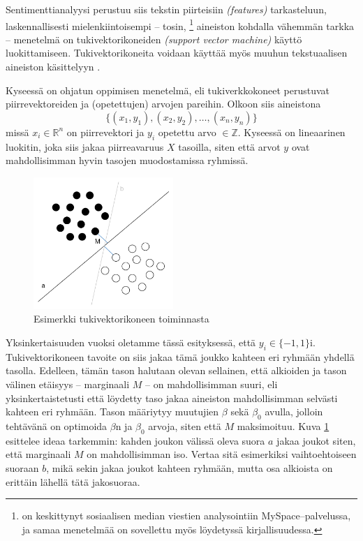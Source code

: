 \documentclass[finnish,gradu,twoside,12pt]{tktltiki}
\begin{document}
{Sentimenttianalyysi perustuu siis tekstin piirteisiin \textit{(features)} tarkasteluun, laskennallisesti mielenkiintoisempi -- tosin, \citet{Thelwall2010}\footnote{\citet{Thelwall2010} on keskittynyt sosiaalisen median viestien analysointiin MySpace--palvelussa, ja samaa menetelmää on sovellettu myös löydetyssä kirjallisuudessa.} aineiston kohdalla vähemmän tarkka -- menetelmä on tukivektorikoneiden \textit{(support vector machine)} käyttö luokittamiseen. Tukivektorikoneita voidaan käyttää myös muuhun tekstuaalisen aineiston käsittelyyn \citep[esimerkiksi][]{Weber2012}.

Kyseessä on ohjatun oppimisen menetelmä, eli tukiverkkokoneet perustuvat piirrevektoreiden ja (opetettujen) arvojen pareihin. Olkoon siis aineistona $$\{ (x_1, y_1), (x_2, y_2), \ldots, (x_n, y_n) \}$$ missä $x_i \in \mathbb{R}^n$ on piirrevektori ja $y_i$ opetettu arvo $\in \mathbb{Z}$. Kyseessä on lineaarinen luokitin, joka siis jakaa piirreavaruus $X$ tasoilla, siten että arvot $y$ ovat mahdollisimman hyvin tasojen muodostamissa ryhmissä.

\begin{figure}
\includegraphics[height=5cm]{images/svm.png} 
\caption{Esimerkki tukivektorikoneen toiminnasta}
\label{fig:svm}
\end{figure}

Yksinkertaisuuden vuoksi oletamme tässä esityksessä, että $y_i \in \{ -1, 1 \}$i. Tukivektorikoneen tavoite on siis jakaa tämä joukko kahteen eri ryhmään yhdellä tasolla. Edelleen, tämän tason halutaan olevan sellainen, että alkioiden ja tason välinen etäisyys -- marginaali $M$ -- on mahdollisimman suuri, eli yksinkertaistetusti että löydetty taso jakaa aineiston mahdollisimman selvästi kahteen eri ryhmään. Tason määriytyy muutujien $\beta$ sekä $\beta_0$ avulla, jolloin tehtävänä on optimoida $\beta$n ja $\beta_0$ arvoja, siten että $M$ maksimoituu. Kuva \ref{fig:svm} esittelee ideaa tarkemmin: kahden joukon välissä oleva suora $a$ jakaa joukot siten, että marginaali $M$ on mahdollisimman iso. Vertaa sitä esimerkiksi vaihtoehtoiseen suoraan $b$, mikä sekin jakaa joukot kahteen ryhmään, mutta osa alkioista on erittäin lähellä tätä jakosuoraa.

}
\end{document}
